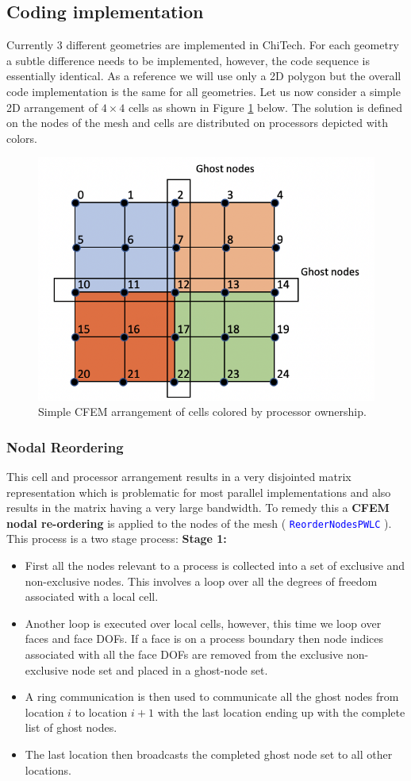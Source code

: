 \documentclass[11pt,letterpaper,titlepage]{article}
\newcommand{\xmltag}[1]{\textcolor{blue}{ \texttt{#1}} }
\numberwithin{equation}{section}
\begin{document}
\vspace{0.5cm}
\subsection{Coding implementation}
Currently 3 different geometries are implemented in ChiTech. For each geometry a subtle difference needs to be implemented, however, the code sequence is essentially identical. As a reference we will use only a 2D polygon but the overall code implementation is the same for all geometries. Let us now consider a simple 2D arrangement of $4{\times}4$ cells as shown in Figure \ref{fig:fourbyfour} below. The solution is defined on the nodes of the mesh and cells are distributed on processors depicted with colors.

\begin{figure}[H]
\centering
\includegraphics[width=0.5\linewidth]{Figures/FourByFour}
\caption{Simple CFEM arrangement of cells colored by processor ownership.}
\label{fig:fourbyfour}
\end{figure}

\subsubsection{Nodal Reordering}

This cell and processor arrangement results in a very disjointed matrix representation which is problematic for most parallel implementations and also results in the matrix having a very large bandwidth. To remedy this a \textbf{CFEM nodal re-ordering} is applied to the nodes of the mesh (\xmltag{ReorderNodesPWLC}). This process is a two stage process:
\newline
\newline
\textbf{Stage 1:}
\begin{itemize}
\item First all the nodes relevant to a process is collected into a set of exclusive and non-exclusive nodes. This involves a loop over all the degrees of freedom associated with a local cell.
\item Another loop is executed over local cells, however, this time we loop over faces and face DOFs. If a face is on a process boundary then node indices associated with all the face DOFs are removed from the exclusive non-exclusive node set and placed in a ghost-node set.
\item A ring communication is then used to communicate all the ghost nodes from location $i$ to location $i+1$ with the last location ending up with the complete list of ghost nodes. 
\item The last location then broadcasts the completed ghost node set to all other locations.
\end{itemize}
\end{document}
